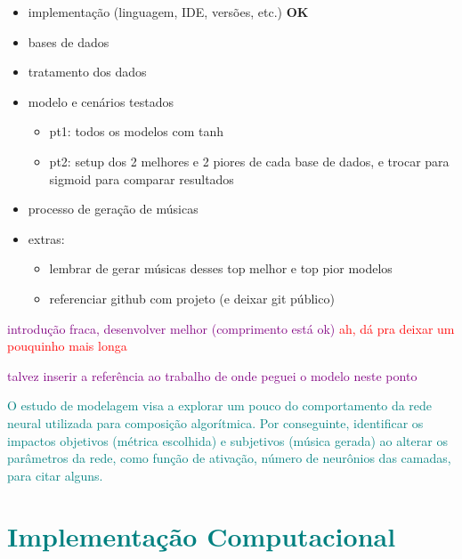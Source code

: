 \documentclass{automatextcc}
\newcommand{\obs}[1]{\textcolor{purple}{#1}}
\newcommand{\nico}[1]{\textcolor{teal}{#1}}
\newcommand{\pumi}[1]{\textcolor{red}{#1}}
\begin{document}
\begin{itemize}
    \item implementação (linguagem, IDE, versões, etc.) \textbf{OK}
    \item bases de dados
    \item tratamento dos dados
    \item modelo e cenários testados
    \begin{itemize}
        \item pt1: todos os modelos com tanh
        \item pt2: setup dos 2 melhores e 2 piores de cada base de dados, e trocar para sigmoid para comparar resultados
    \end{itemize}
    \item processo de geração de músicas
    \item extras:
    \begin{itemize}
        \item lembrar de gerar músicas desses top melhor e top pior modelos
        \item referenciar github com projeto (e deixar git público)
    \end{itemize}
\end{itemize}

\obs{introdução fraca, desenvolver melhor (comprimento está ok)} \pumi{ ah, dá pra deixar um pouquinho mais longa}

\obs{talvez inserir a referência ao trabalho de onde peguei o modelo neste ponto}

\nico{
O estudo de modelagem visa a explorar um pouco do comportamento da rede neural utilizada para composição algorítmica. Por conseguinte, identificar os impactos objetivos (métrica escolhida) e subjetivos (música gerada) ao alterar os parâmetros da rede, como função de ativação, número de neurônios das camadas, para citar alguns. 
}

\section{\nico{Implementação Computacional}}
\end{document}
